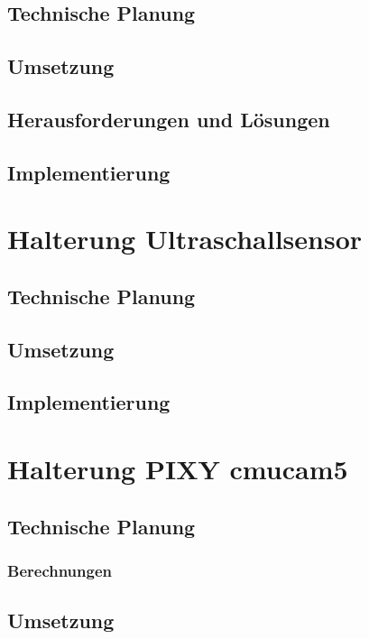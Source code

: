 	\subsection{Technische Planung}

	\subsection{Umsetzung}

	\subsection{Herausforderungen und Lösungen}

	\subsection{Implementierung}

\section{Halterung Ultraschallsensor}

	\subsection{Technische Planung}

	\subsection{Umsetzung}

	\subsection{Implementierung}

\section{Halterung PIXY cmucam5}

	\subsection{Technische Planung}

		\subsubsection{Berechnungen}

	\subsection{Umsetzung}

